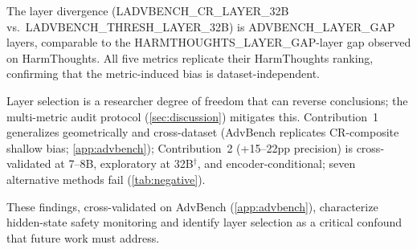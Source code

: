 The layer divergence (L{{ADVBENCH_CR_LAYER_32B}} vs.\ L{{ADVBENCH_THRESH_LAYER_32B}}) is {{ADVBENCH_LAYER_GAP}} layers, comparable to the {{HARMTHOUGHTS_LAYER_GAP}}-layer gap observed on HarmThoughts. All five metrics replicate their HarmThoughts ranking, confirming that the metric-induced bias is dataset-independent.


Layer selection is a researcher degree of freedom that can reverse conclusions; the multi-metric audit protocol (\cref{sec:discussion}) mitigates this. Contribution~1 generalizes geometrically and cross-dataset (AdvBench replicates CR-composite shallow bias; \cref{app:advbench}); Contribution~2 (+15--22pp precision) is cross-validated at 7--8B, exploratory at 32B$^\dagger$, and encoder-conditional; seven alternative methods fail (\cref{tab:negative}).


\noindent These findings, cross-validated on AdvBench (\cref{app:advbench}), characterize hidden-state safety monitoring and identify layer selection as a critical confound that future work must address.








